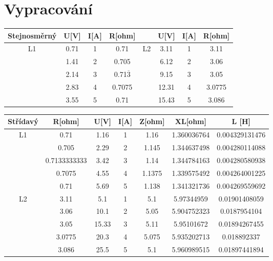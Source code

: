 \documentclass[a4paper]{article}
\begin{document}
\section*{Vypracování}
\begin{tabular}{c|c|c|c||c|c|c|c}
	Stejnosměrný & U[V] & I[A] & R[ohm]&& U[V] & I[A] & R[ohm] \\
	\hline
	L1 & 0.71 & 1 & 0.71 & L2 & 3.11 & 1 & 3.11 \\
	& 1.41 & 2 & 0.705 & & 6.12 & 2 & 3.06 \\
	& 2.14 & 3 & 0.71$\overline{3}$ & & 9.15 & 3 & 3.05 \\
	& 2.83 & 4 & 0.7075 & & 12.31 & 4 & 3.0775 \\
	& 3.55 & 5 & 0.71 & & 15.43 & 5 & 3.086 \\
\end{tabular}
\newpage
\begin{tabular}{c|c|c|c|c|c|c}
	Střídavý & R[ohm] & U[V] & I[A] & Z[ohm] & XL[ohm] & L [H] \\ \hline
	L1 & 0.71 & 1.16 & 1 & 1.16 & 1.360036764 & 0.004329131476 \\
	& 0.705 & 2.29 & 2 & 1.145 & 1.344637498 & 0.004280114088 \\
	& 0.7133333333 & 3.42 & 3 & 1.14 & 1.344784163 & 0.004280580938 \\
	& 0.7075 & 4.55 & 4 & 1.1375 & 1.339575492 & 0.004264001225 \\
	& 0.71 & 5.69 & 5 & 1.138 & 1.341321736 & 0.004269559692 \\ \hline
	L2 & 3.11 & 5.1 & 1 & 5.1 & 5.97344959 & 0.01901408059 \\
	& 3.06 & 10.1 & 2 & 5.05 & 5.904752323 & 0.0187954104 \\
	& 3.05 & 15.33 & 3 & 5.11 & 5.95101672 & 0.01894267455 \\
	& 3.0775 & 20.3 & 4 & 5.075 & 5.935202713 & 0.018892337 \\
	& 3.086 & 25.5 & 5 & 5.1 & 5.960989515 & 0.01897441894 \\
\end{tabular}
\end{document}
